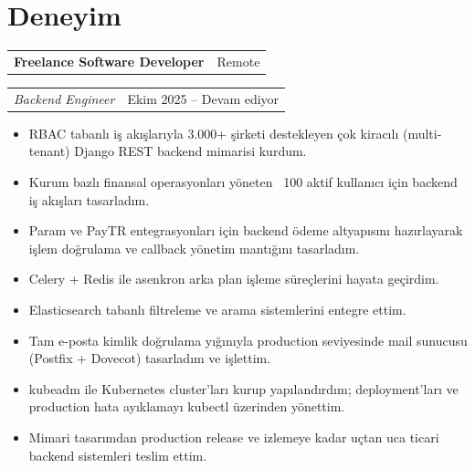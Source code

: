 \documentclass[10pt,a4paper]{extarticle}
\makeatletter
\newcommand{\entry}[2]{%
\noindent\begin{tabular*}{\textwidth}{@{\extracolsep{\fill}}lr}
\textbf{#1} & #2\\
\end{tabular*}
}
\newcommand{\subentry}[2]{%
\noindent\begin{tabular*}{\textwidth}{@{\extracolsep{\fill}}lr}
\textit{#1} & #2\\
\end{tabular*}
}
\makeatother
\begin{document}
\section{Deneyim}

\entry{Freelance Software Developer}{Remote}
\subentry{Backend Engineer}{Ekim 2025 -- Devam ediyor}
\begin{itemize}[leftmargin=*,noitemsep,topsep=0pt]
\item RBAC tabanlı iş akışlarıyla 3.000+ şirketi destekleyen çok kiracılı (multi-tenant) Django REST backend mimarisi kurdum.
\item Kurum bazlı finansal operasyonları yöneten ~100 aktif kullanıcı için backend iş akışları tasarladım.
\item Param ve PayTR entegrasyonları için backend ödeme altyapısını hazırlayarak işlem doğrulama ve callback yönetim mantığını tasarladım.
\item Celery + Redis ile asenkron arka plan işleme süreçlerini hayata geçirdim.
\item Elasticsearch tabanlı filtreleme ve arama sistemlerini entegre ettim.
\item Tam e-posta kimlik doğrulama yığınıyla production seviyesinde mail sunucusu (Postfix + Dovecot) tasarladım ve işlettim.
\item kubeadm ile Kubernetes cluster'ları kurup yapılandırdım; deployment'ları ve production hata ayıklamayı kubectl üzerinden yönettim.
\item Mimari tasarımdan production release ve izlemeye kadar uçtan uca ticari backend sistemleri teslim ettim.
\end{itemize}
\end{document}
